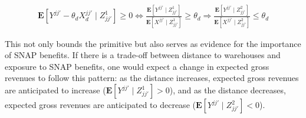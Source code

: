 \documentclass[11pt]{article}
\begin{document}
      \begin{align*}
          \mathbf{E}[Y^{jj'}-\theta_d X_d^{jj'} \mid Z^{1}_{jj'}] \geq 0 \iff \frac{\mathbf{E}[Y^{jj'}\mid Z^{1}_{jj'}]}{\mathbf{E}[X^{jj'}\mid Z^{1}_{jj'}]}\geq \theta_d  \Rightarrow \frac{\mathbf{E}[Y^{jj'}\mid Z^{2}_{jj'}]}{\mathbf{E}[X^{jj'}\mid Z^{2}_{jj'}]}\leq \theta_d 
      \end{align*}

    This not only bounds the primitive but also serves as evidence for the importance of SNAP benefits. If there is a trade-off between distance to warehouses and exposure to SNAP benefits, one would expect a change in expected gross revenues to follow this pattern: as the distance increases, expected gross revenues are anticipated to increase ($\mathbf{E}[Y^{jj'} \mid Z^{1}_{jj'}] > 0$), and as the distance decreases, expected gross revenues are anticipated to decrease ($\mathbf{E}[Y^{jj'} \mid Z^{2}_{jj'}] < 0$).


      





\end{document}
